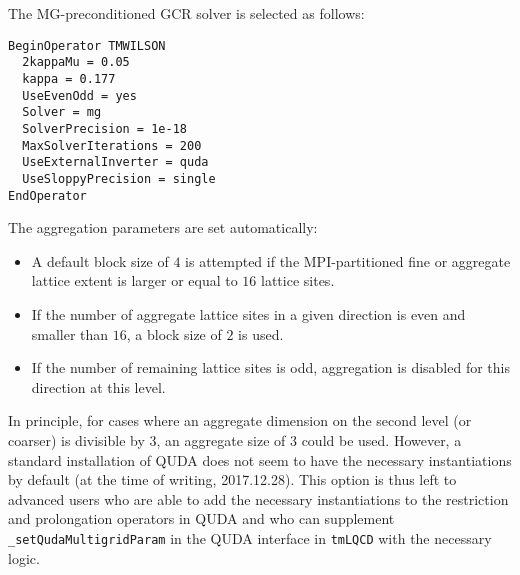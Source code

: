 The MG-preconditioned GCR solver is selected as follows:
\begin{verbatim}
BeginOperator TMWILSON
  2kappaMu = 0.05
  kappa = 0.177
  UseEvenOdd = yes
  Solver = mg
  SolverPrecision = 1e-18
  MaxSolverIterations = 200
  UseExternalInverter = quda
  UseSloppyPrecision = single
EndOperator
\end{verbatim}

The aggregation parameters are set automatically:
\begin{itemize}
  \item{ A default block size of $4$ is attempted if the MPI-partitioned fine or aggregate lattice extent is larger or equal to $16$ lattice sites. }
  \item{ If the number of aggregate lattice sites in a given direction is even and smaller than $16$, a block size of $2$ is used. }
  \item{ If the number of remaining lattice sites is odd, aggregation is disabled for this direction at this level. }
\end{itemize}
In principle, for cases where an aggregate dimension on the second level (or coarser) is divisible by $3$, an aggregate size of $3$ could be used.
However, a standard installation of QUDA does not seem to have the necessary instantiations by default (at the time of writing, 2017.12.28).
This option is thus left to advanced users who are able to add the necessary instantiations to the restriction and prolongation operators in QUDA and who can supplement \texttt{\_setQudaMultigridParam} in the QUDA interface in \texttt{tmLQCD} with the necessary logic.

